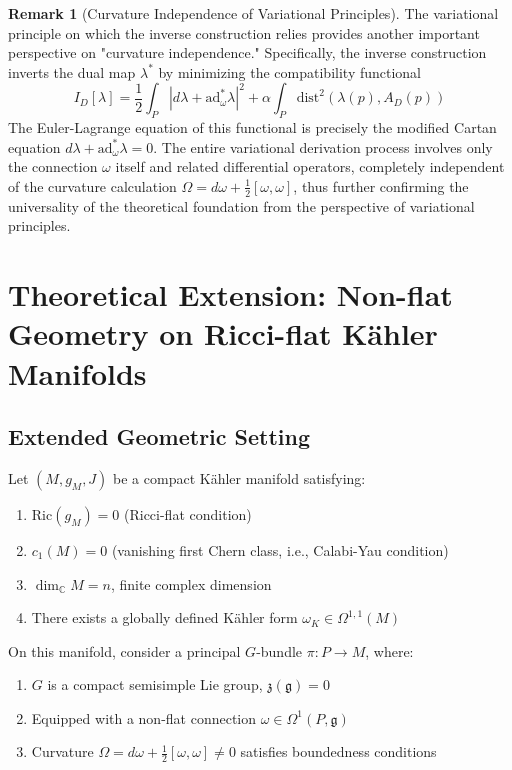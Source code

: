 \documentclass[a4paper,12pt]{extarticle}
\theoremstyle{definition}
\newtheorem{remark}{Remark}
\begin{document}
\begin{remark}[Curvature Independence of Variational Principles]
The variational principle on which the inverse construction relies provides another important perspective on "curvature independence." Specifically, the inverse construction inverts the dual map $\lambda^*$ by minimizing the compatibility functional
$$I_D[\lambda] = \frac{1}{2}\int_P |d\lambda + \text{ad}_\omega^* \lambda|^2 + \alpha \int_P \text{dist}^2(\lambda(p), A_D(p))$$
The Euler-Lagrange equation of this functional is precisely the modified Cartan equation $d\lambda + \text{ad}_\omega^* \lambda = 0$. The entire variational derivation process involves only the connection $\omega$ itself and related differential operators, completely independent of the curvature calculation $\Omega = d\omega + \frac{1}{2}[\omega, \omega]$, thus further confirming the universality of the theoretical foundation from the perspective of variational principles.
\end{remark}

\section{Theoretical Extension: Non-flat Geometry on Ricci-flat Kähler Manifolds}

\subsection{Extended Geometric Setting}

Let $(M, g_M, J)$ be a compact Kähler manifold satisfying:
\begin{enumerate}
\item $\text{Ric}(g_M) = 0$ (Ricci-flat condition)
\item $c_1(M) = 0$ (vanishing first Chern class, i.e., Calabi-Yau condition)
\item $\dim_{\mathbb{C}} M = n$, finite complex dimension
\item There exists a globally defined Kähler form $\omega_K \in \Omega^{1,1}(M)$
\end{enumerate}

On this manifold, consider a principal $G$-bundle $\pi: P \to M$, where:
\begin{enumerate}
\item $G$ is a compact semisimple Lie group, $\mathfrak{z}(\mathfrak{g}) = 0$
\item Equipped with a non-flat connection $\omega \in \Omega^1(P, \mathfrak{g})$
\item Curvature $\Omega = d\omega + \frac{1}{2}[\omega, \omega] \neq 0$ satisfies boundedness conditions
\end{enumerate}
\end{document}

